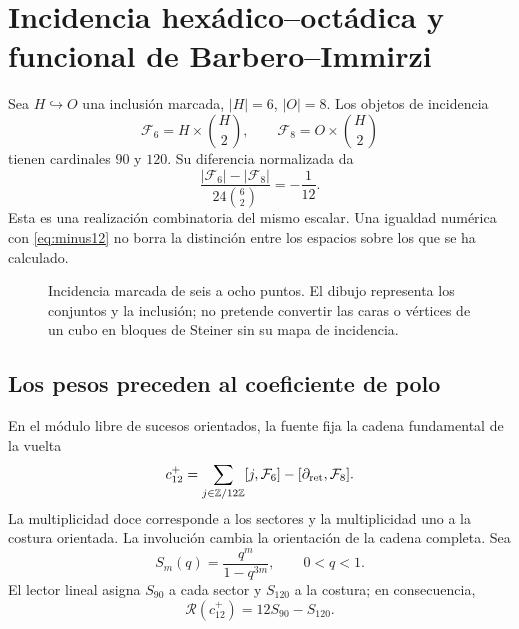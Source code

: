 \section{Incidencia hexádico--octádica y funcional de Barbero--Immirzi}
\label{sec:barbero}
Sea $H\hookrightarrow O$ una inclusión marcada, $|H|=6$, $|O|=8$.
Los objetos de incidencia
\[
\mathcal F_6=H\times\binom H2,\qquad
\mathcal F_8=O\times\binom H2
\]
tienen cardinales $90$ y $120$. Su diferencia normalizada da
\[
\frac{|\mathcal F_6|-|\mathcal F_8|}{24\binom62}=-\frac1{12}.
\]
Esta es una realización combinatoria del mismo escalar.
Una igualdad numérica con \eqref{eq:minus12} no borra
la distinción entre los espacios sobre los que se ha calculado.

\begin{figure}[htbp]
\centering
{}
\caption{Incidencia marcada de seis a ocho puntos. El dibujo representa
los conjuntos y la inclusión; no pretende convertir las caras o vértices
de un cubo en bloques de Steiner sin su mapa de incidencia.}
\end{figure}

\subsection{Los pesos preceden al coeficiente de polo}
En el módulo libre de sucesos orientados, la fuente fija la cadena
fundamental de la vuelta \cite{precedencia}
\[
c_{12}^{+}=
\sum_{j\in\mathbb Z/12\mathbb Z}[j,\mathcal F_6]
-[\partial_{\rm ret},\mathcal F_8].
\]
La multiplicidad doce corresponde a los sectores y la multiplicidad uno
a la costura orientada. La involución cambia la orientación de la cadena
completa. Sea
\[
S_m(q)=\frac{q^m}{1-q^{3m}},\qquad 0<q<1.
\]
El lector lineal asigna $S_{90}$ a cada sector y $S_{120}$ a la costura;
en consecuencia,
\[
\mathscr R(c_{12}^{+})=12S_{90}-S_{120}.
\]

